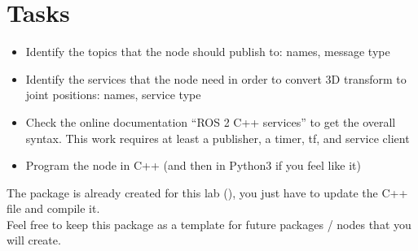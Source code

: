 \documentclass{ecnreport}
\begin{document}
\section{Tasks}

\begin{itemize}
\item Identify the topics that the node should publish to: names, message type
\item Identify the services that the node need in order to convert 3D transform to joint positions: names, service type
\item Check the online documentation ``ROS 2 C++ services'' to get the overall syntax. This work requires at least a publisher, a timer, tf, and service client
\item Program the node in C++ (and then in Python3 if you feel like it)
\end{itemize}

The package is already created for this lab (), you just have to update the C++ file and compile it.\\
Feel free to keep this package as a template for future packages / nodes that you will create.
\end{document}
